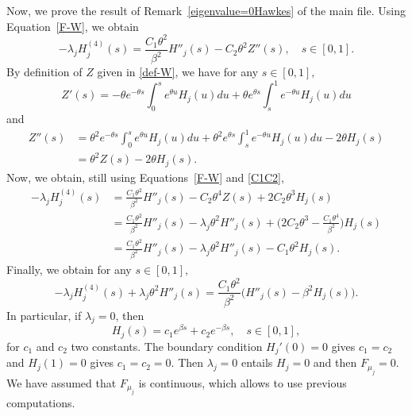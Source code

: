 \documentclass[aos]{imsart}
\theoremstyle{plain}
\theoremstyle{remark}
\newcommand{\1}{1}
\begin{document}
Now, we prove the result of Remark~\ref{eigenvalue=0Hawkes} of the main file. Using Equation~\eqref{F-W}, we obtain
\[
-\lambda_j H^{(4)}_j(s)=\frac{C_1\theta^2}{\beta^2}H''_j(s)-C_2\theta^2 Z''(s), \quad s\in [0,1].
\]
By definition of $Z$ given in \eqref{def-W}, we have for any $s\in [0,1],$
\[
Z'(s)=-\theta e^{-\theta s}\int_0^se^{\theta u}H_j(u)du+\theta e^{\theta s}\int_s^1 e^{-\theta u}H_j(u)du
\]
and
\begin{align*}
Z''(s)&=\theta^2 e^{-\theta s}\int_0^se^{\theta u}H_j(u)du+\theta^2 e^{\theta s}\int_s^1 e^{-\theta u}H_j(u)du-2\theta H_j(s)\\
&=\theta^2Z(s)-2\theta H_j(s).
\end{align*}
Now, we obtain, still using Equations~\eqref{F-W} and \eqref{C1C2},
\begin{align*}
-\lambda_j H^{(4)}_j(s)&=\frac{C_1\theta^2}{\beta^2}H''_j(s)-C_2\theta^4 Z(s)+2C_2\theta^3H_j(s)\\
&=\frac{C_1\theta^2}{\beta^2}H''_j(s)-\lambda_j\theta^2H''_j(s)+\Big(2C_2\theta^3-\frac{C_1\theta^4}{\beta^2}\Big)H_j(s)\\
&=\frac{C_1\theta^2}{\beta^2}H''_j(s)-\lambda_j\theta^2H''_j(s)-C_1\theta^2H_j(s).
\end{align*}
Finally, we obtain for any $s\in [0,1],$
\begin{equation}\label{eqordre4}
-\lambda_j H^{(4)}_j(s)+\lambda_j\theta^2H''_j(s)=\frac{C_1\theta^2}{\beta^2}\Big(H''_j(s)-\beta^2H_j(s)\Big).
\end{equation}
In particular, if $\lambda_j=0$, then
\[
H_j(s)=c_1e^{\beta s}+c_2e^{-\beta s},\quad s\in [0,1],
\]
for $c_1$ and $c_2$ two constants.
The boundary condition $H_j'(0)=0$ gives $c_1=c_2$ and $H_j(1)=0$ gives $c_1=c_2=0$. Then $\lambda_j=0$ entails $H_j=0$ and then $F_{\mu_j}=0$. We have assumed that $F_{\mu_j}$ is continuous, which allows to use previous computations.
\end{document}
